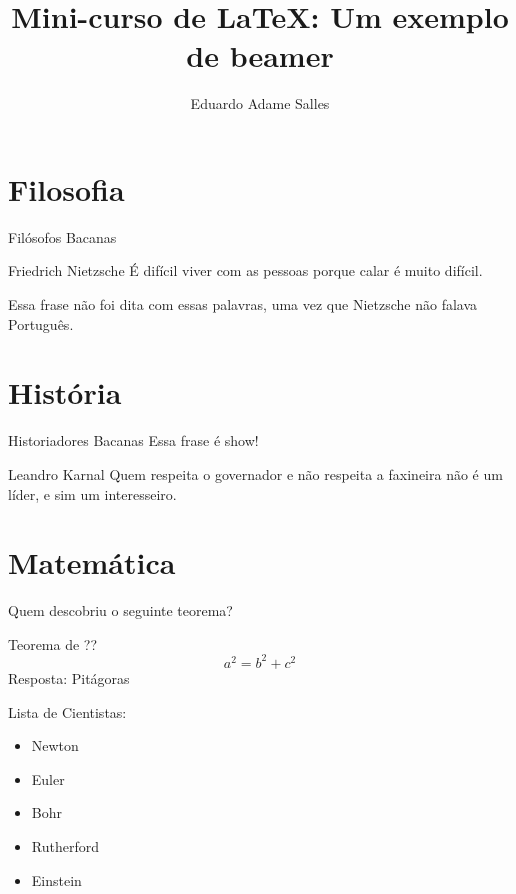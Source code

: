 \documentclass[aspectratio=169,11pt]{beamer}
\author[ADAME, Eduardo]{Eduardo Adame Salles}
\title[Um exemplo de beamer]{Mini-curso de \LaTeX : Um exemplo de beamer}
\institute[CEFET/RJ]{Centro Federal de Educação Tecnológica Celso Suckow da Fonseca}
\begin{document}
\begin{frame}
\titlepage
\end{frame}

\section{Filosofia}
\begin{frame}{Filósofos Bacanas}
\begin{block}{Friedrich Nietzsche}
É difícil viver com as pessoas porque calar é muito difícil.
\end{block}
Essa frase não foi dita com essas palavras, uma vez que Nietzsche não falava Português.
\end{frame}

\section{História}
\begin{frame}{Historiadores Bacanas}
Essa frase é show!
\begin{block}{Leandro Karnal}
Quem respeita o governador e não respeita a faxineira não é um líder, e sim um interesseiro.
\end{block}
\end{frame}

\section{Matemática}
\begin{frame}{}
Quem descobriu o seguinte teorema?
\begin{block}{Teorema de ??}
$$a^2 = b^2 + c^2$$
Resposta: \pause{}Pitágoras
\end{block}
Lista de Cientistas:
\begin{itemize}
\pause{}
\item Newton
\pause{}
\item Euler
\pause{}
\item Bohr
\pause{}
\item Rutherford
\pause{}
\item Einstein
\end{itemize}
\end{frame}
\end{document}
